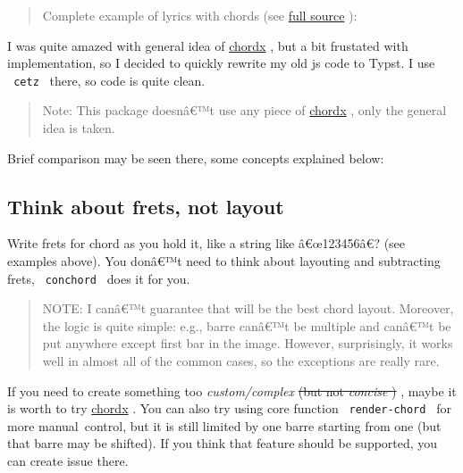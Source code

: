 \begin{quote}
Complete example of lyrics with chords (see
\href{https://github.com/typst/packages/raw/main/packages/preview/conchord/0.2.0/examples/zombie.typ}{full
source} ):
\end{quote}


I was quite amazed with general idea of
\href{https://github.com/ljgago/typst-chords}{chordx} , but a bit
frustated with implementation, so I decided to quickly rewrite my old js
code to Typst. I use \texttt{\ cetz\ } there, so code is quite clean.

\begin{quote}
Note: This package doesnâ€™t use any piece of
\href{https://github.com/ljgago/typst-chords}{chordx} , only the general
idea is taken.
\end{quote}

Brief comparison may be seen there, some concepts explained below:


\subsection{Think about frets, not
layout}\label{think-about-frets-not-layout}

Write frets for chord as you hold it, like a string like â€œ123456â€?
(see examples above). You donâ€™t need to think about layouting and
subtracting frets, \texttt{\ conchord\ } does it for you.

\begin{quote}
NOTE: I canâ€™t guarantee that will be the best chord layout. Moreover,
the logic is quite simple: e.g., barre canâ€™t be multiple and canâ€™t
be put anywhere except first bar in the image. However, surprisingly, it
works well in almost all of the common cases, so the exceptions are
really rare.
\end{quote}

If you need to create something too \emph{custom/complex} \st{(but not
\emph{concise} )} , maybe it is worth to try
\href{https://github.com/ljgago/typst-chords}{chordx} . You can also try
using core function \texttt{\ render-chord\ } for more manual~control,
but it is still limited by one barre starting from one (but that barre
may be shifted). If you think that feature should be supported, you can
create issue there.

